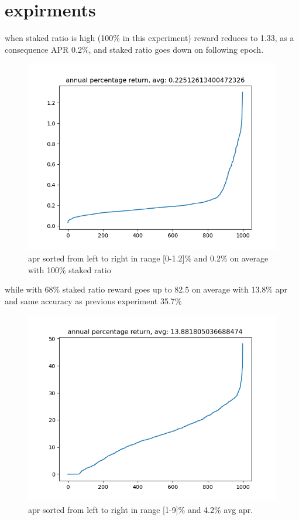 \documentclass{article}
\begin{document}
\section{expirments}
\begin{description}
\item when staked ratio is high (100\% in this experiment) reward reduces to 1.33, as a consequence APR 0.2\%, and staked ratio goes down on following epoch.
  \begin{figure}
    \includegraphics{fullstake_apr.png}
    \caption{apr sorted from left to right in range [0-1.2]\% and 0.2\% on average with 100\% staked ratio}
  \end{figure}
\item while with 68\% staked ratio reward goes up to 82.5 on average with 13.8\% apr and same accuracy as previous experiment 35.7\%
  \begin{figure}
    \includegraphics{halfstake_apr.png}
    \caption{apr sorted from left to right in range [1-9]\% and 4.2\% avg apr.}
  \end{figure}


\end{description}
\end{document}
